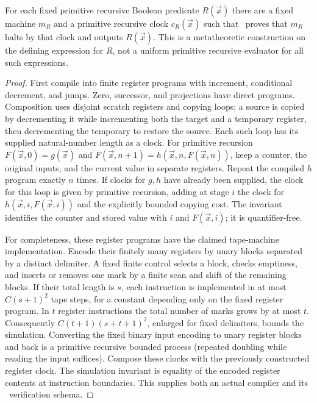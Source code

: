 \begin{lemma}
\label{eff:compile}
For each fixed primitive recursive Boolean predicate $R(\vec x)$ there are
a fixed machine $m_R$ and a primitive recursive clock $c_R(\vec x)$ such that
\ipra\ proves that $m_R$ halts by that clock and outputs $R(\vec x)$.
This is a metatheoretic construction on the defining expression for $R$,
not a uniform primitive recursive evaluator for all such expressions.
\end{lemma}
\begin{proof}
First compile into finite register programs with increment, conditional
decrement, and jumps.  Zero, successor, and projections have direct programs.
Composition uses disjoint scratch registers and copying loops; a source is
copied by decrementing it while incrementing both the target and a temporary
register, then decrementing the temporary to restore the source.  Each such loop has
its supplied natural-number length as a clock.  For primitive recursion
$F(\vec x,0)=g(\vec x)$ and
$F(\vec x,n+1)=h(\vec x,n,F(\vec x,n))$, keep a counter, the original inputs,
and the current value in separate registers.  Repeat the compiled $h$
program exactly $n$ times.  If clocks for $g,h$ have already been supplied,
the clock for this loop is given by primitive recursion, adding at stage $i$
the clock for $h(\vec x,i,F(\vec x,i))$ and the explicitly bounded copying
cost.  The invariant identifies the counter and stored value with $i$ and
$F(\vec x,i)$; it is quantifier-free.

For completeness, these register programs have the claimed tape-machine
implementation.  Encode their finitely many registers by unary blocks
separated by a distinct delimiter.  A fixed finite control selects a block,
checks emptiness, and inserts or removes one mark by a finite scan and shift
of the remaining blocks.  If their total length is $s$, each instruction is
implemented in at most $C(s+1)^2$ tape steps, for a constant depending only on
the fixed register program.  In $t$ register instructions the total number
of marks grows by at most $t$.  Consequently
$C(t+1)(s+t+1)^2$, enlarged for fixed delimiters, bounds the simulation.
Converting the fixed binary input encoding to unary register blocks and
back is a primitive recursive bounded process (repeated doubling while
reading the input suffices).  Compose these clocks with the previously
constructed register clock.  The simulation invariant is equality of the
encoded register contents at instruction boundaries.  This supplies both
an actual compiler and its \ipra\ verification schema.
\end{proof}

